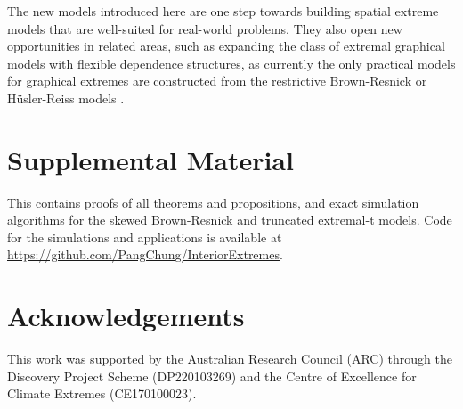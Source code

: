 \documentclass[12pt]{article}
\begin{document}

The new models introduced here are 
one step towards building spatial extreme models that are well-suited for real-world problems.
They also open new opportunities in related areas, such as
expanding the class of extremal graphical models with flexible dependence structures, as currently the only practical models for graphical extremes are constructed from the restrictive Brown-Resnick or H\"usler-Reiss models \citep{Engelke.Hitz:2020,Hentschel.Engelke.Segers:2024,Wan.Zhou:2023}. 


\section*{Supplemental Material}

This contains proofs of all theorems and propositions, and exact simulation algorithms for the skewed Brown-Resnick and truncated extremal-t models. Code for the simulations and applications is available at \url{https://github.com/PangChung/InteriorExtremes}. 

\section*{Acknowledgements}

This work was supported by the Australian Research Council (ARC) through the Discovery Project Scheme (DP220103269) and the Centre of Excellence for Climate Extremes (CE170100023). 

\baselineskip=18pt


\end{document}
